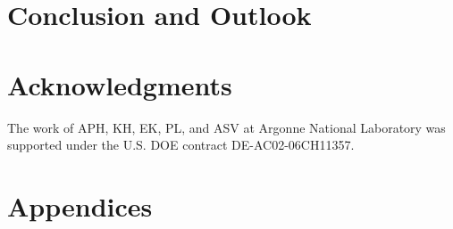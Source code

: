 \documentclass[11pt]{report}
\begin{document}
\section{Conclusion and Outlook}
\label{sec:outlook}


\clearpage

\section*{Acknowledgments}



The work of APH, KH, EK, PL, and ASV at Argonne National Laboratory was supported under the U.S. DOE contract DE-AC02-06CH11357.




\clearpage





\clearpage
\appendix
\renewcommand\thefigure{\thesection\arabic{figure}}
\renewcommand\thetable{\thesection\arabic{table}}
\renewcommand{\thesection}{\Alph{section}}
\renewcommand{\thesubsection}{\Alph{section}\arabic{subsection}}

\section*{Appendices}
\end{document}
